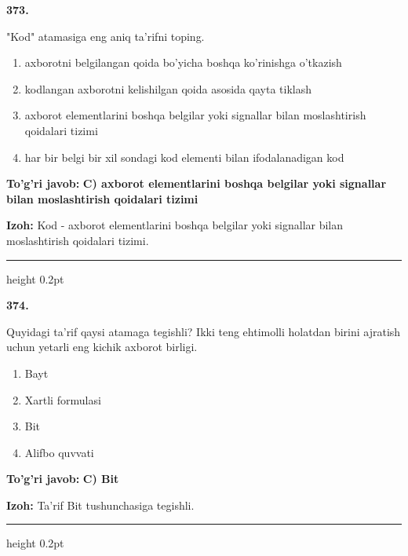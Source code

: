 \documentclass[10pt,a4paper,oneside]{article}
\begin{document}
\noindent\textbf{\color{ink}373.}
\par
"Kod" atamasiga eng aniq ta'rifni toping.
\begin{enumerate}[label=\Alph*),leftmargin=9mm]
\item axborotni belgilangan qoida bo'yicha boshqa ko'rinishga o'tkazish
\item kodlangan axborotni kelishilgan qoida asosida qayta tiklash
\item axborot elementlarini boshqa belgilar yoki signallar bilan moslashtirish qoidalari tizimi
\item har bir belgi bir xil sondagi kod elementi bilan ifodalanadigan kod
\end{enumerate}
\begin{tcolorbox}[enhanced,breakable,colback=teal!4,colframe=teal!50!black,boxrule=0.5pt,arc=1.1mm,left=3mm,right=3mm,top=1.7mm,bottom=1.7mm,before skip=2mm,after skip=2mm]
\textbf{\color{teal}To'g'ri javob:} \textbf{C) axborot elementlarini boshqa belgilar yoki signallar bilan moslashtirish qoidalari tizimi}
\par\smallskip
\textbf{Izoh:} Kod - axborot elementlarini boshqa belgilar yoki signallar bilan moslashtirish qoidalari tizimi.
\end{tcolorbox}
\vspace{2mm}\hrule height 0.2pt \vspace{3mm}

\noindent\textbf{\color{ink}374.}
\par
Quyidagi ta'rif qaysi atamaga tegishli? Ikki teng ehtimolli holatdan birini ajratish uchun yetarli eng kichik axborot birligi.
\begin{enumerate}[label=\Alph*),leftmargin=9mm]
\item Bayt
\item Xartli formulasi
\item Bit
\item Alifbo quvvati
\end{enumerate}
\begin{tcolorbox}[enhanced,breakable,colback=teal!4,colframe=teal!50!black,boxrule=0.5pt,arc=1.1mm,left=3mm,right=3mm,top=1.7mm,bottom=1.7mm,before skip=2mm,after skip=2mm]
\textbf{\color{teal}To'g'ri javob:} \textbf{C) Bit}
\par\smallskip
\textbf{Izoh:} Ta'rif Bit tushunchasiga tegishli.
\end{tcolorbox}
\vspace{2mm}\hrule height 0.2pt \vspace{3mm}
\end{document}
